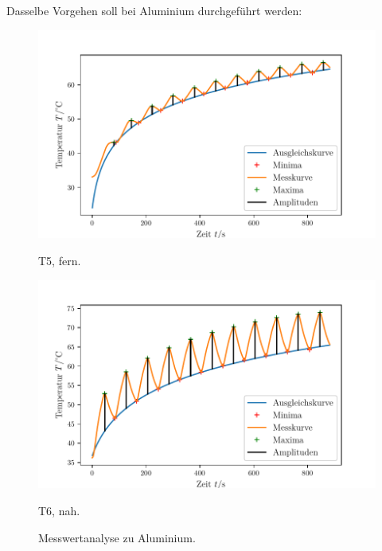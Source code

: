 Dasselbe Vorgehen soll bei Aluminium durchgeführt werden:
\begin{figure}
    \centering
    \begin{minipage}{.5\textwidth}
        \centering
        \includegraphics[max width=1.1\linewidth]{plots/amplitudes_brass_wide_far(t1).pdf} %
        \caption{T5, fern.}
        \label{fig:plot_amps_t5}
    \end{minipage}%
    \begin{minipage}{.5\textwidth}
        \centering
        \includegraphics[max width=1.1\linewidth]{plots/amplitudes_brass_wide_close(t2).pdf} %
        \caption{T6, nah.}
        \label{fig:plot_amps_t6}
    \end{minipage}
    \caption{Messwertanalyse zu Aluminium.}
    \label{fig:plots_amps_t5_t6}
\end{figure}
